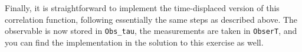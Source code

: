 \documentclass[10pt,modern]{scrartcl}
\numberwithin{exerciseitem}{exercise} %
\begin{document}
Finally, it is straightforward to implement the time-displaced version of this correlation function, following essentially the same steps as described above. The observable is now stored in \texttt{Obs\_tau}, the measurements are taken in \texttt{ObserT}, and you can find the implementation in the solution to this exercise as well.
\end{document}
